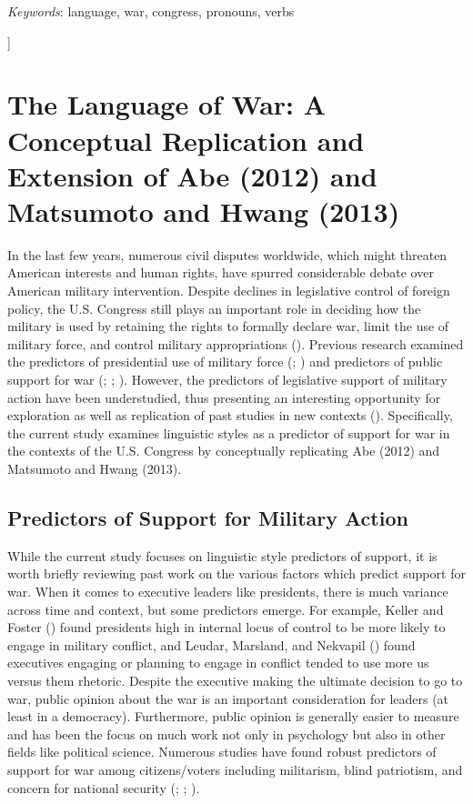 \documentclass[jou,a4paper]{apa6}
\begin{document}
\smallbreak

\medbreak
\textit{Keywords}: language, war, congress, pronouns, verbs
\par\vspace{4ex}]

\section{The Language of War: A Conceptual Replication and Extension of Abe (2012) and Matsumoto and Hwang (2013)}

In the last few years, numerous civil disputes worldwide, which might threaten American interests and human rights, have spurred considerable debate over American military intervention. Despite declines in legislative control of foreign policy, the U.S. Congress still plays an important role in deciding how the military is used by retaining the rights to formally declare war, limit the use of military force, and control military appropriations (\cite{Phelps2002}). Previous research examined the predictors of presidential use of military force (\cite{Clark2005}; \cite{Keller2012}) and predictors of public support for war (\cite{Cohrs2002}; \cite{Friese2009}; \cite{McCleary2009}). However, the predictors of legislative support of military action have been understudied, thus presenting an interesting opportunity for exploration as well as replication of past studies in new contexts (\cite{Kriner2014}). Specifically, the current study examines linguistic styles as a predictor of support for war in the contexts of the U.S. Congress by conceptually replicating Abe (2012) and Matsumoto and Hwang (2013).

\subsection{Predictors of Support for Military Action}

While the current study focuses on linguistic style predictors of support, it is worth briefly reviewing past work on the various factors which predict support for war. When it comes to executive leaders like presidents, there is much variance across time and context, but some predictors emerge. For example, Keller and Foster (\citeyear{Keller2012}) found presidents high in internal locus of control to be more likely to engage in military conflict, and Leudar, Marsland, and Nekvapil (\citeyear{Leudar2004}) found executives engaging or planning to engage in conflict tended to use more us versus them rhetoric. Despite the executive making the ultimate decision to go to war, public opinion about the war is an important consideration for leaders (at least in a democracy). Furthermore, public opinion is generally easier to measure and has been the focus on much work not only in psychology but also in other fields like political science. Numerous studies have found robust predictors of support for war among citizens/voters including militarism, blind patriotism, and concern for national security (\cite{Cohrs2002}; \cite{Friese2009}; \cite{McCleary2009}).
\end{document}
